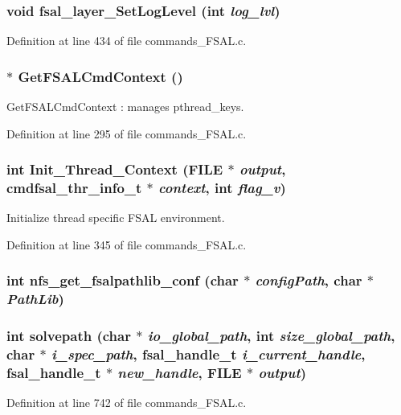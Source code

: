 \subsubsection[{fsal\_\-layer\_\-SetLogLevel}]{\setlength{\rightskip}{0pt plus 5cm}void fsal\_\-layer\_\-SetLogLevel (int {\em log\_\-lvl})}\label{commands__FSAL_8c_a8d06115f7aed032f29bab10e1bafc79e}


Definition at line 434 of file commands\_\-FSAL.c.
\subsubsection[{GetFSALCmdContext}]{$\ast$ GetFSALCmdContext ()}\label{commands__FSAL_8c_a992f9fbc20f25850200bd52f03264bdf}
GetFSALCmdContext : manages pthread\_\-keys. 

Definition at line 295 of file commands\_\-FSAL.c.
\subsubsection[{Init\_\-Thread\_\-Context}]{\setlength{\rightskip}{0pt plus 5cm}int Init\_\-Thread\_\-Context (FILE $\ast$ {\em output}, \/  {\bf cmdfsal\_\-thr\_\-info\_\-t} $\ast$ {\em context}, \/  int {\em flag\_\-v})}\label{commands__FSAL_8c_a62d7f2806ded1d6e99e33114e4e445c8}
Initialize thread specific FSAL environment. 

Definition at line 345 of file commands\_\-FSAL.c.
\subsubsection[{nfs\_\-get\_\-fsalpathlib\_\-conf}]{\setlength{\rightskip}{0pt plus 5cm}int nfs\_\-get\_\-fsalpathlib\_\-conf (char $\ast$ {\em configPath}, \/  char $\ast$ {\em PathLib})}\label{commands__FSAL_8c_a46ba6b9e44fe82656046e12f3ad0ff04}
\subsubsection[{solvepath}]{\setlength{\rightskip}{0pt plus 5cm}int solvepath (char $\ast$ {\em io\_\-global\_\-path}, \/  int {\em size\_\-global\_\-path}, \/  char $\ast$ {\em i\_\-spec\_\-path}, \/  fsal\_\-handle\_\-t {\em i\_\-current\_\-handle}, \/  fsal\_\-handle\_\-t $\ast$ {\em new\_\-handle}, \/  FILE $\ast$ {\em output})}\label{commands__FSAL_8c_a52fc69129efee557919082cf79bd643c}


Definition at line 742 of file commands\_\-FSAL.c.